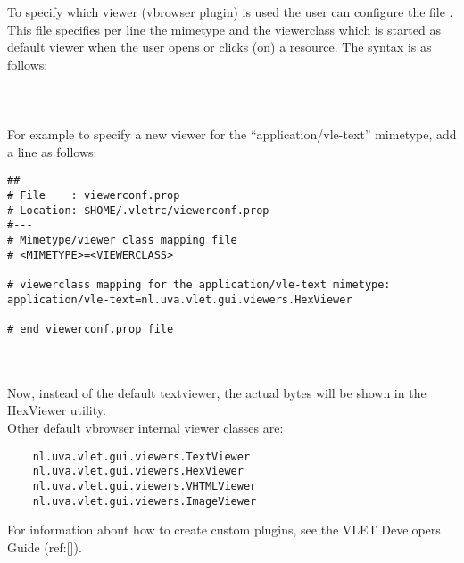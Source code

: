 To specify which viewer (vbrowser plugin) is used the user can configure the file
.
This file specifies per line the mimetype and the viewerclass which is started
as default viewer when the user opens or clicks (on) a resource.
The syntax is as follows:\\
\\
\tab {}\\
\\
For example to specify a new viewer for the ``application/vle-text'' mimetype,
add a line as follows:\\

\begin{boxedlisting}
\begin{verbatim}
##
# File    : viewerconf.prop 
# Location: $HOME/.vletrc/viewerconf.prop
#---
# Mimetype/viewer class mapping file 
# <MIMETYPE>=<VIEWERCLASS> 

# viewerclass mapping for the application/vle-text mimetype:
application/vle-text=nl.uva.vlet.gui.viewers.HexViewer

# end viewerconf.prop file 
\end{verbatim}
\end{boxedlisting}\\
\\
Now, instead of the default textviewer, the actual bytes will be shown in the 
HexViewer utility.\\
Other default vbrowser internal viewer classes are:
\begin{verbatim}
	nl.uva.vlet.gui.viewers.TextViewer
	nl.uva.vlet.gui.viewers.HexViewer 
	nl.uva.vlet.gui.viewers.VHTMLViewer
	nl.uva.vlet.gui.viewers.ImageViewer
\end{verbatim}

For information about how to create custom plugins, see the VLET Developers 
Guide (ref:[]).


 